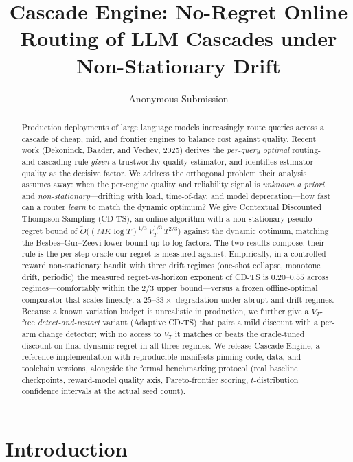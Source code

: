 \documentclass[11pt]{article}
\title{\textbf{Cascade Engine:} No-Regret Online Routing of LLM Cascades under Non-Stationary Drift}
\author{Anonymous Submission}
\date{}
\theoremstyle{definition}
\begin{document}
\maketitle

\begin{abstract}
Production deployments of large language models increasingly route queries
across a cascade of cheap, mid, and frontier engines to balance cost against
quality. Recent work (Dekoninck, Baader, and Vechev, 2025) derives the
\emph{per-query optimal} routing-and-cascading rule \emph{given} a trustworthy
quality estimator, and identifies estimator quality as the decisive factor.
We address the orthogonal problem their analysis assumes away: when the
per-engine quality and reliability signal is \emph{unknown a priori} and
\emph{non-stationary}---drifting with load, time-of-day, and model
deprecation---how fast can a router \emph{learn} to match the dynamic
optimum? We give Contextual Discounted Thompson Sampling (CD-TS), an online
algorithm with a non-stationary pseudo-regret bound of
$\widetilde{O}\!\big((MK\log T)^{1/3}\, V_T^{1/3}\, T^{2/3}\big)$ against the
dynamic optimum, matching the Besbes--Gur--Zeevi lower bound up to log
factors. The two results compose: their rule is the per-step oracle our
regret is measured against. Empirically, in a controlled-reward
non-stationary bandit with three drift regimes
(one-shot collapse, monotone drift, periodic) the measured regret-vs-horizon
exponent of CD-TS is $0.20$--$0.55$ across regimes---comfortably within the
$2/3$ upper bound---versus a frozen offline-optimal comparator that scales
linearly, a $25$--$33{\times}$ degradation under abrupt and drift regimes.
Because a known variation budget is unrealistic in production, we further give
a $V_T$-free \emph{detect-and-restart} variant (Adaptive CD-TS) that pairs a
mild discount with a per-arm change detector; with no access to $V_T$ it
matches or beats the oracle-tuned discount on final dynamic regret in all three
regimes. We release Cascade Engine, a reference implementation with reproducible
manifests pinning code, data, and toolchain versions, alongside the formal
benchmarking protocol (real baseline checkpoints, reward-model quality axis,
Pareto-frontier scoring, $t$-distribution confidence intervals at the actual
seed count).
\end{abstract}

\section{Introduction}
\label{sec:intro}
\end{document}
